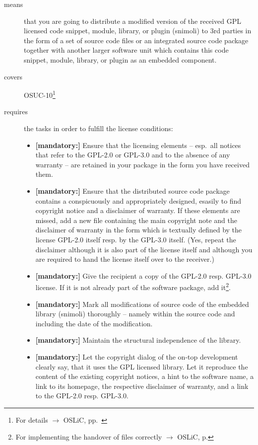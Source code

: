 \begin{description}
\item[means] that you are going to distribute a modified version of the received
GPL licensed code snippet, module, library, or plugin (snimoli) to 3rd
parties in the form of a set of source code files or an integrated source code
package together with another larger software unit which contains this code
snippet, module, library, or plugin as an embedded component.
\item[covers] OSUC-10\footnote{For details $\rightarrow$ OSLiC, pp.\ \pageref{OSUC-10-DEF}}
\item[requires] the tasks in order to fulfill the license conditions:
\begin{itemize}


  \item \textbf{[mandatory:]} Ensure that the licensing elements -- esp.\ all
  notices that refer to the GPL-2.0 or GPL-3.0 and to the absence of any
  warranty -- are retained in your package in the form you have received them.

  \item \textbf{[mandatory:]} Ensure that the distributed source code package
  contains a conspicuously and appropriately designed, esasily to find copyright
  notice and a disclaimer of warranty. If these elements are missed, add a new
  file containing the main copyright note and the disclaimer of warranty in the
  form which is textually defined by the license GPL-2.0 itself resp. by the
  GPL-3.0 itself. (Yes, repeat the disclaimer although it is also part of the
  license itself and although you are required to hand the license itself over
  to the receiver.)
  
  \item \textbf{[mandatory:]} Give the recipient a copy of the GPL-2.0 resp.
  GPL-3.0 license. If it is not already part of the software package, add
  it\footnote{For implementing the handover of files correctly $\rightarrow$
  OSLiC, p. \pageref{DistributingFilesHint}}.
    
  \item \textbf{[mandatory:]} Mark all modifications of source code of the
  embedded library (snimoli) thoroughly --
  namely within the source code and including the date of the modification.

  \item \textbf{[mandatory:]}  Maintain the structural independence of the
  library.
   
  \item \textbf{[mandatory:]} Let the copyright dialog of the on-top development
  clearly say, that it uses the GPL licensed library. Let it reproduce the
  content of the existing copyright notices, a hint to the software name, a link
  to its homepage, the respective disclaimer of warranty, and a link to the
  GPL-2.0 resp. GPL-3.0.
     

\end{itemize}
\end{description}
